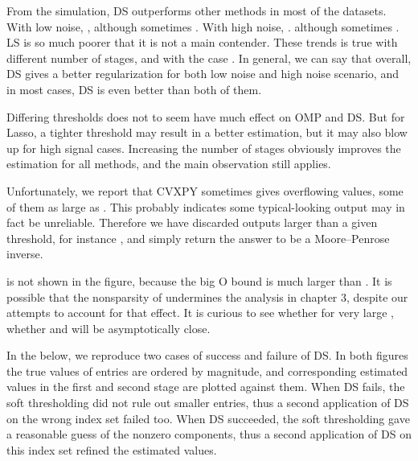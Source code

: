 \stopsubsection

\startsubsection [title={Discussion}]

From the simulation, DS outperforms other methods in most of the datasets.
With low noise, ,
although sometimes .
With high noise, .
although sometimes .
LS is so much poorer that it is not a main contender.
These trends is true with different number of stages, and with the case .
In general, we can say that overall, DS gives a better regularization for both low noise and high noise scenario, and in most cases, DS is even better than both of them.

Differing thresholds does not to seem have much effect on OMP and DS.
But for Lasso, a tighter threshold may result in a better estimation, but it may also blow up for high signal cases.
Increasing the number of stages obviously improves the estimation for all methods, and the main observation still applies.

Unfortunately, we report that CVXPY sometimes gives overflowing values, some of them as large as .
This probably indicates some typical-looking output may in fact be unreliable.
Therefore we have discarded outputs larger than a given threshold, for instance , and simply return the answer to be a Moore–Penrose inverse.

\m {\chi} is not shown in the figure, because the big O bound is much larger than \m {\T {\chi}}.
It is possible that the nonsparsity of  undermines the analysis in chapter 3, despite our attempts to account for that effect.
It is curious to see whether for very large , whether \m {\T {\chi}} and \m {\chi} will be asymptotically close.

In the below, we reproduce two cases of success and failure of DS.
In both figures the true values of  entries are ordered by magnitude, and corresponding estimated values in the first and second stage are plotted against them.
When DS fails, the soft thresholding did not rule out smaller entries, thus a second application of DS on the wrong index set failed too.
When DS succeeded, the soft thresholding gave a reasonable guess of the nonzero components, thus a second application of DS on this index set refined the estimated values.

